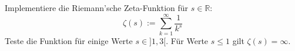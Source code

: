 \begin{aufg}
Implementiere die Riemann'sche Zeta-Funktion für $s \in \mathbb R$: $$
\zeta(s) := \sum_{k=1}^\infty \frac{1}{k^s} $$
Teste die Funktion für einige Werte $s \in ] 1, 3 [$. Für Werte $s \leq 1$
gilt $\zeta(s) = \infty$.
\end{aufg}
